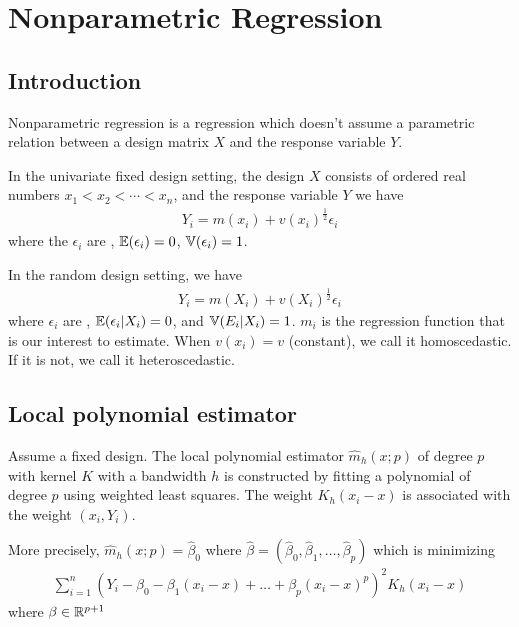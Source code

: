 \chapter{Nonparametric Regression}
\label{cha:nonp-regr}

\section{Introduction}
\label{sec:introduction}

Nonparametric regression is a regression which doesn't assume a
parametric relation between a design matrix $X$ and the response
variable $Y$.

In the univariate fixed design setting, the design $X$ consists of
ordered real numbers $x_{1} < x_{2} < \cdots < x_{n}$, and the
response variable $Y$ we have
\begin{align}
  \label{eq:50}
  Y_{i} = m(x_{i}) + v(x_{i})^{\frac{1}{2}} \epsilon_{i}
\end{align} where the $\epsilon_{i}$ are \iid, $\E{\epsilon_{i}} = 0$,
$\Var{\epsilon_{i}} = 1$.

In the random design setting, we have
\begin{align}
  \label{eq:51}
  Y_{i} = m(X_{i}) + v(X_{i})^{\frac{1}{2}} \epsilon_{i}
\end{align} where $\epsilon_{i}$ are \iid, $\E{\epsilon_{i} | X_{i}} =
0$, and $\Var{E_{i} | X_{i}} = 1$. $m_{i}$ is the regression function
that is our interest to estimate. When $v(x_{i}) = v$ (constant), we
call it homoscedastic. If it is not, we call it heteroscedastic.

\section{Local polynomial estimator}
\label{sec:local-polyn-estim}

Assume a fixed design.  The local polynomial estimator $\hat m_{h}(x;
p)$ of degree $p$ with kernel $K$ with a bandwidth $h$ is constructed
by fitting a polynomial of degree $p$ using weighted least squares.
The weight $K_{h}(x_{i} - x)$ is associated with the weight $(x_{i},
Y_{i})$.

More precisely, $\hat m_{h}(x; p) = \hat \beta_{0}$ where $\hat \beta =
(\hat \beta_{0}, \hat \beta_{1}, \dots, \hat \beta_{p})$ which is
minimizing
\begin{align}
  \label{eq:52}
  \sum_{i=1}^{n} (Y_{i} - \beta_{0} - \beta_{1}(x_{i} - x) + \dots +
  \beta_{p}(x_{i} - x)^{p})^{2} K_{h}(x_{i} - x)
\end{align} where $\beta \in \mathbb{R}^{p+1}$

